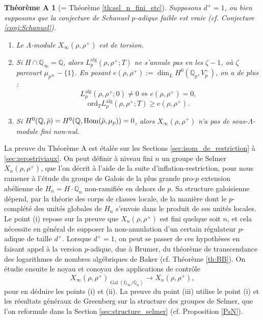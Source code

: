 \documentclass[12pt]{amsart}
\newcommand\bQ{\mathbb{Q}}
\newcommand\Qp{\mathbb{Q}_{p}}
\newcommand{\ob}[1]{\mkern 1.5mu\overline{\mkern-1.5mu#1\mkern-1.5mu}\mkern 1.5mu}
\newcommand{\ord}{\mathrm{ord}}
\newcommand{\alg}{\textrm{alg}}
\DeclareMathOperator{\Gal}{Gal}
\DeclareMathOperator{\Hom}{Hom}
\theoremstyle{defstyle}
\theoremstyle{thmstyle}
\newtheorem*{thA}{Théorème A}
\begin{document}
\begin{thA}[= Théorème \ref{th:sel_n_fini_etc}]
	Supposons $d^+=1$, ou bien supposons que la conjecture de Schanuel $p$-adique faible est vraie (cf. Conjecture \ref{conj:Schanuel}).
	\begin{enumerate}
		\item[(i)] Le $\Lambda$-module $X_\infty(\rho,\rho^+)$ est de torsion.
		\item[(ii)] Si $H\cap \bQ_\infty =\bQ$, alors $L_p^{\alg}(\rho,\rho^+;T)$ ne s'annule pas en les $\zeta-1$, où $\zeta$ parcourt $\mu_{p^\infty}-\{1\}$. En posant $e(\rho,\rho^+):=\dim_L H^0(\Qp,V_p^-)$, on a de plus :
		$$L_p^{\alg}(\rho,\rho^+;0)\neq 0 \Longleftrightarrow e(\rho,\rho^+)=0,$$  
		$$\ord_{T} L_p^{\alg}(\rho,\rho^+;T) \geq e(\rho,\rho^+).$$
		
		\item[(iii)] Si $H^0(\bQ,\ob{\rho})=H^0(\bQ,\Hom(\ob{\rho},\mu_p))=0$, alors $X_\infty(\rho,\rho^+)$ n'a pas de sous-$\Lambda$-module fini non-nul.
	\end{enumerate}
	
\end{thA}

La preuve du Théorème A est étalée sur les Sections \ref{sec:isom_de_restriction} à \ref{sec:zerostriviaux}. On peut définir à niveau fini $n$ un groupe de Selmer $X_n(\rho,\rho^+)$,  que l'on décrit à l'aide de la suite d'inflation-restriction, pour nous ramener à l'étude du groupe de Galois de la plus grande pro-$p$ extension abélienne de $H_n=H\cdot \bQ_n$ non-ramifiée en dehors de $p$. Sa structure galoisienne dépend, par la théorie des corps de classes locale, de la manière dont le $p$-complété des unités globales de $H_n$ s'envoie dans le produit de ses unités locales. Le point (i) repose sur la preuve que $X_n(\rho,\rho^+)$ est fini quelque soit $n$, et cela nécessite en général de supposer la non-annulation d'un certain régulateur $p$-adique de taille $d^+$. Lorsque $d^+=1$, on peut se passer de ces hypothèses en faisant appel à la version $p$-adique, due à Brumer, du théorème  de transcendance des logarithmes de nombres algébriques de Baker (cf. Théorème \ref{th:BB}). On étudie ensuite le noyau et conoyau des applications de contrôle 
$$X_\infty( \rho,\rho^+)_{\Gal(\bQ_\infty/\bQ_n)} \longrightarrow X_n(\rho,\rho^+),$$
pour en déduire les points (i) et (ii). La preuve du point (iii) utilise le point (i) et les résultats généraux de Greenberg sur la structure des groupes de Selmer, que l'on reformule dans la Section \ref{sec:structure_selmer} (cf. Proposition \ref{PsN}).
\end{document}
